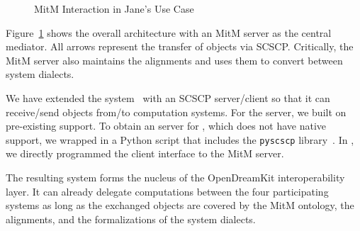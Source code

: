 \begin{figure}[ht]\centering\vspace*{-1em}
  \caption{MitM Interaction in Jane's Use Case}\label{fig:mitmpoc}\vspace*{-1em}
\end{figure}

Figure~\ref{fig:mitmpoc} shows the overall architecture with an MitM server as the central mediator.
All arrows represent the transfer of \OMMT objects via SCSCP.
Critically, the MitM server also maintains the alignments and uses them to convert between system dialects.

We have extended the \MMT system~\cite{Rabe:MAGMS13} with an SCSCP server/client so that it can receive/send objects from/to computation systems.
For the \GAP server, we built on pre-existing \SCSCP support.
To obtain an \SCSCP server for \Singular, which does not have native \SCSCP support, we wrapped \Singular in a Python script that includes the \lstinline|pyscscp| library~\cite{py-scscp:on}.
In \Sage, we directly programmed the client interface to the MitM server. 

The resulting system forms the nucleus of the OpenDreamKit interoperability layer. It can already delegate computations between the four participating systems as long as the exchanged objects are covered by the MitM ontology, the alignments, and the formalizations of the system dialects.

